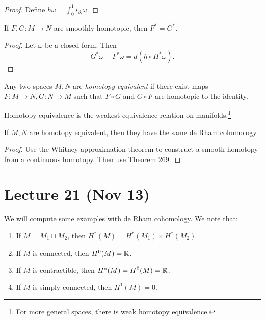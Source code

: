 \documentclass[twoside, 10pt]{article}
\begin{document}
    \begin{proof} Define $h \omega = \int_0^1 i_{\partial_t} \omega$.
    \end{proof}

    \begin{thm} If $F,G:M \to N$ are smoothly homotopic, then $F^* = G^*$.
    \end{thm}

    \begin{proof} Let $\omega$ be a closed form. Then \[ G^*\omega - F^*\omega
    = d(h\circ H^*\omega).\] \end{proof}

    \begin{defn} Any two spaces $M,N$ are \textit{homotopy equivalent} if there
    exist maps $F:M \to N, G:N \to M$ such that $F \circ G$ and $G \circ F$ are
homotopic to the identity.  \end{defn}

    \begin{rmk} Homotopy equivalence is the weakest equivalence relation on
    manifolds.\footnote{For more general spaces, there is weak homotopy
equivalence.} \end{rmk}

    \begin{cor} If $M,N$ are homotopy equivalent, then they have the same de
    Rham cohomology.  \end{cor}

    \begin{proof} Use the Whitney approximation theorem to construct a smooth
    homotopy from a continuous homotopy. Then use Theorem 269.  \end{proof}

    \section{Lecture 21 (Nov 13)}%

    We will compute some examples with de Rham cohomology. We note that:
    \begin{enumerate} \item If $M = M_1 \sqcup M_2$, then $H^*(M) = H^*(M_1)
        \times H^*(M_2)$.  \item If $M$ is connected, then $H^0(M) = \mathbb{R}$.
    \item If $M$ is contractible, then $H^*(M) = H^0(M) = \mathbb{R}$.  \item If $M$ is
simply connected, then $H^1(M) = 0$.  \end{enumerate}
\end{document}
